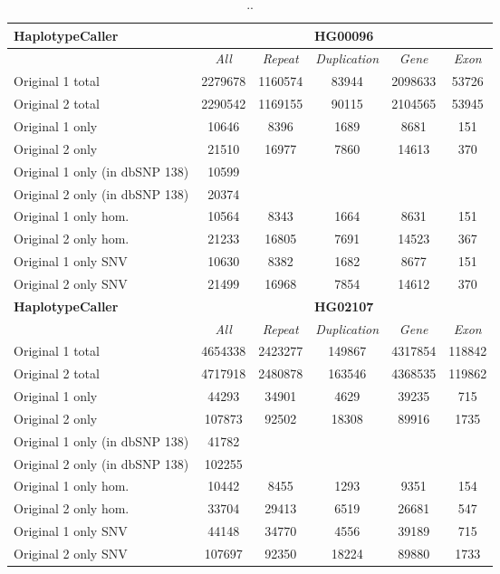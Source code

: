 \begin{table}[htb]
\caption{ .. }
\begin{center}
\begin{tabular}{|l|c||c|c|c|c|}
\hline
{\bf HaplotypeCaller} & \multicolumn{5}{|c|}{\bf HG00096} \\
\hline
\cline{2-6}
{\bf} & {\it All} & {\it Repeat} & {\it Duplication} & {\it Gene} & {\it Exon} \\
\hline
Original 1 total & 2279678 & 1160574 & 83944 & 2098633 & 53726\\
\hline
Original 2 total & 2290542 & 1169155 & 90115 & 2104565 & 53945\\
\hline
Original 1 only & 10646 & 8396 & 1689 & 8681 & 151\\
\hline 
Original 2 only & 21510 & 16977 & 7860 & 14613 & 370\\
\hline 
Original 1 only (in dbSNP 138) & 10599 &  &  &  & \\
\hline 
Original 2 only (in dbSNP 138) & 20374 &  &  &  & \\
\hline 
Original 1 only hom. & 10564 & 8343 & 1664 & 8631 & 151\\
\hline 
Original 2 only hom. & 21233 & 16805 & 7691 & 14523 & 367\\
\hline 
Original 1 only SNV & 10630 & 8382 & 1682 & 8677 & 151\\
\hline 
Original 2 only SNV & 21499 & 16968 & 7854 & 14612 & 370\\
\hline
\hline
{\bf HaplotypeCaller} & \multicolumn{5}{|c|}{\bf HG02107} \\
\hline
\cline{2-6}
{\bf} & {\it All} & {\it Repeat} & {\it Duplication} & {\it Gene} & {\it Exon} \\
\hline
Original 1 total & 4654338 & 2423277 & 149867 & 4317854 & 118842\\ 
\hline
Original 2 total & 4717918 & 2480878 & 163546 & 4368535 & 119862\\ 
\hline
Original 1 only & 44293 & 34901 & 4629 & 39235 & 715\\
\hline 
Original 2 only & 107873 & 92502 & 18308 & 89916 & 1735\\
\hline 
Original 1 only (in dbSNP 138) & 41782 &  &  &  & \\
\hline 
Original 2 only (in dbSNP 138) & 102255 &  &  &  & \\
\hline 
Original 1 only hom. & 10442 & 8455 & 1293 & 9351 & 154\\
\hline 
Original 2 only hom. & 33704 & 29413 & 6519 & 26681 & 547\\
\hline 
Original 1 only SNV & 44148 & 34770 & 4556 & 39189 & 715\\
\hline 
Original 2 only SNV & 107697 & 92350 & 18224 & 89880 & 1733\\
\hline 
\end{tabular}
\end{center}
\label{tab:orig-vs-orig2-hc}
\end{table}

